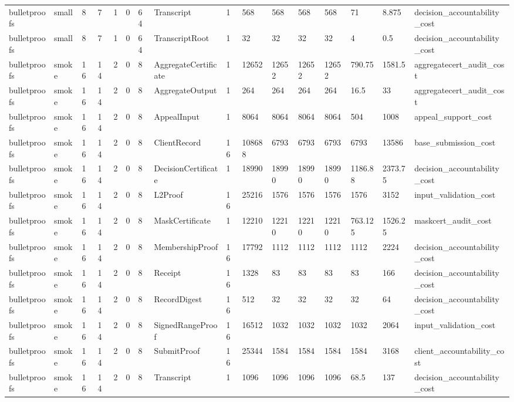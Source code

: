 \begin{table}[t]
\begin{tabular}{llllllllllllllll}
bulletproofs & small & 8 & 7 & 1 & 0 & 64 & Transcript & 1 & 568 & 568 & 568 & 568 & 71 & 8.875 & decision\_accountability\_cost \\
bulletproofs & small & 8 & 7 & 1 & 0 & 64 & TranscriptRoot & 1 & 32 & 32 & 32 & 32 & 4 & 0.5 & decision\_accountability\_cost \\
bulletproofs & smoke & 16 & 14 & 2 & 0 & 8 & AggregateCertificate & 1 & 12652 & 12652 & 12652 & 12652 & 790.75 & 1581.5 & aggregatecert\_audit\_cost \\
bulletproofs & smoke & 16 & 14 & 2 & 0 & 8 & AggregateOutput & 1 & 264 & 264 & 264 & 264 & 16.5 & 33 & aggregatecert\_audit\_cost \\
bulletproofs & smoke & 16 & 14 & 2 & 0 & 8 & AppealInput & 1 & 8064 & 8064 & 8064 & 8064 & 504 & 1008 & appeal\_support\_cost \\
bulletproofs & smoke & 16 & 14 & 2 & 0 & 8 & ClientRecord & 16 & 108688 & 6793 & 6793 & 6793 & 6793 & 13586 & base\_submission\_cost \\
bulletproofs & smoke & 16 & 14 & 2 & 0 & 8 & DecisionCertificate & 1 & 18990 & 18990 & 18990 & 18990 & 1186.88 & 2373.75 & decision\_accountability\_cost \\
bulletproofs & smoke & 16 & 14 & 2 & 0 & 8 & L2Proof & 16 & 25216 & 1576 & 1576 & 1576 & 1576 & 3152 & input\_validation\_cost \\
bulletproofs & smoke & 16 & 14 & 2 & 0 & 8 & MaskCertificate & 1 & 12210 & 12210 & 12210 & 12210 & 763.125 & 1526.25 & maskcert\_audit\_cost \\
bulletproofs & smoke & 16 & 14 & 2 & 0 & 8 & MembershipProof & 16 & 17792 & 1112 & 1112 & 1112 & 1112 & 2224 & decision\_accountability\_cost \\
bulletproofs & smoke & 16 & 14 & 2 & 0 & 8 & Receipt & 16 & 1328 & 83 & 83 & 83 & 83 & 166 & decision\_accountability\_cost \\
bulletproofs & smoke & 16 & 14 & 2 & 0 & 8 & RecordDigest & 16 & 512 & 32 & 32 & 32 & 32 & 64 & decision\_accountability\_cost \\
bulletproofs & smoke & 16 & 14 & 2 & 0 & 8 & SignedRangeProof & 16 & 16512 & 1032 & 1032 & 1032 & 1032 & 2064 & input\_validation\_cost \\
bulletproofs & smoke & 16 & 14 & 2 & 0 & 8 & SubmitProof & 16 & 25344 & 1584 & 1584 & 1584 & 1584 & 3168 & client\_accountability\_cost \\
bulletproofs & smoke & 16 & 14 & 2 & 0 & 8 & Transcript & 1 & 1096 & 1096 & 1096 & 1096 & 68.5 & 137 & decision\_accountability\_cost \\

\end{tabular}
\end{table}
